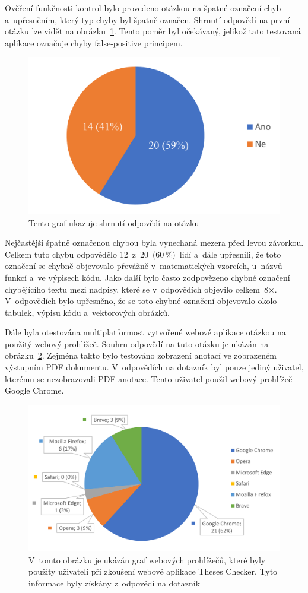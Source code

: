 Ověření funkčnosti kontrol bylo provedeno otázkou na špatné označení chyb
a~upřesněním, který typ chyby byl špatně označen. Shrnutí odpovědí na
první otázku lze vidět na obrázku~\ref{pic_graph_false_mistakes}.
Tento poměr byl očekávaný, jelikož tato testovaná aplikace označuje chyby
false-positive principem.

\begin{figure}[H]
    \centering
    \includegraphics[width=0.6\linewidth]{obrazky-figures/graph_false_mistakes.pdf}
    \caption{
        Tento graf ukazuje shrnutí odpovědí na otázku 
    }
    \label{pic_graph_false_mistakes}
\end{figure}

Nejčastější špatně označenou chybou byla vynechaná mezera před levou závorkou. 
Celkem tuto chybu odpovědělo 12~z~20~(60\,\%)~lidí a~dále upřesnili, že
toto označení se chybně objevovalo převážně v~matematických vzorcích, u~názvů
funkcí a~ve výpisech kódu. Jako další bylo často zodpovězeno chybné označení
chybějícího textu mezi nadpisy, které se v~odpovědích objevilo celkem~8$\times$.
V~odpovědích bylo upřesněno, že se toto chybné označení objevovalo
okolo tabulek, výpisu kódu a~vektorových obrázků.

Dále byla otestována multiplatformost vytvořené webové aplikace otázkou
na použitý webový prohlížeč. Souhrn odpovědí na tuto otázku je ukázán na
obrázku~\ref{pic_graph_browser}. Zejména takto bylo testováno zobrazení
anotací ve zobrazeném výstupním PDF dokumentu. V~odpovědích na dotazník
byl pouze jediný uživatel, kterému se nezobrazovali PDF anotace. Tento 
uživatel použil webový prohlížeč Google Chrome.

\begin{figure}[H]
    \centering
    \includegraphics[width=0.85\linewidth]{obrazky-figures/graph_browser.pdf}
    \caption{
        V~tomto obrázku je ukázán graf webových prohlížečů, které byly
        použity uživateli při zkoušení webové aplikace Theses Checker.
        Tyto informace byly získány z~odpovědí na dotazník
    }
    \label{pic_graph_browser}
\end{figure}


